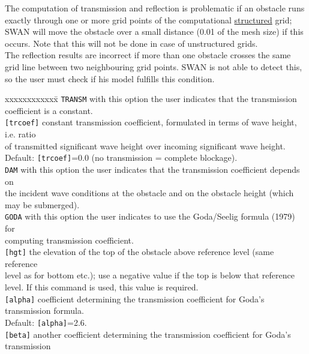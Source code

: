 \documentclass[12pt]{book}
\begin{document}
\noindent
The computation of transmission and reflection is problematic if an obstacle runs exactly through one or
more grid points of the computational \underline{structured} grid; SWAN will move the obstacle over a small
distance (0.01 of the mesh size) if this occurs. Note that this will not be done in case of unstructured
grids.
\\[2ex]
\noindent
The reflection results are incorrect if more than one obstacle crosses the
same grid line between two neighbouring grid points. SWAN is not able to detect this, so the user must
check if his model fulfills this condition.
\begin{tabbing}
xxxxxxxxxxxx\= \kill
{\tt TRANSM}     \> with this option the user indicates that the transmission coefficient is a constant.\\
{\tt [trcoef]}   \> constant transmission coefficient, formulated in terms of wave height, i.e. ratio\+\\
                    of transmitted significant wave height over incoming significant wave height.\\
                    Default: {\tt [trcoef]}=0.0 (no transmission = complete blockage).\-\\
{\tt DAM}        \> with this option the user indicates that the transmission coefficient depends on\+\\
                    the incident wave conditions at the obstacle and on the obstacle height (which\\
                    may be submerged).\-\\
{\tt GODA}       \> with this option the user indicates to use the Goda/Seelig formula (1979) for\+\\
                    computing transmission coefficient.\-\\
{\tt [hgt]}      \> the elevation of the top of the obstacle above reference level (same reference\+\\
                    level as for bottom etc.); use a negative value if the top is below that reference\\
                    level. If this command is used, this value is required.\-\\
{\tt [alpha]}    \> coefficient determining the transmission coefficient for Goda's transmission formula.\+\\
                    Default: {\tt [alpha]}=2.6.\-\\
{\tt [beta]}     \> another coefficient determining the transmission coefficient for Goda's transmission\+\\

\end{tabbing}
\end{document}
